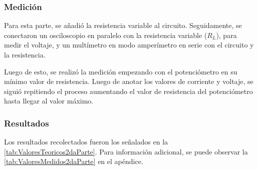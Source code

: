 \documentclass{article}
\begin{document}
            \subsubsection{Medición}

            \quad Para esta parte, se añadió la resistencia variable al circuito. Seguidamente, se conectaron 
            un osciloscopio en paralelo con la resistencia variable ($R_{L}$), para medir el voltaje, y un 
            multímetro en modo amperímetro en serie con el circuito y la resistencia.\par
            Luego de esto, se realizó la medición empezando con el potenciómetro en su mínimo valor de 
            resistencia. Luego de anotar los valores de corriente y voltaje, se siguió repitiendo el 
            proceso aumentando el valor de resistencia del potenciómetro hasta llegar al valor máximo.\par
            

            \subsubsection{Resultados}
            
            \quad Los resultados recolectados fueron los señalados en la \autoref{tab:ValoresTeoricos2daParte}. Para información adicional, se puede observar la \autoref{tab:ValoresMedidos2daParte} en el apéndice.\par
\end{document}
